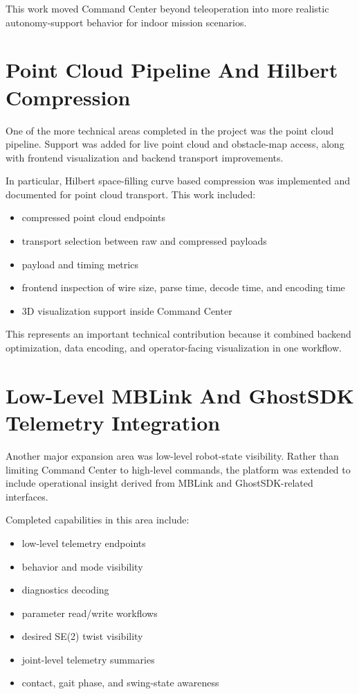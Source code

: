 \documentclass[11pt]{article}
\begin{document}
This work moved Command Center beyond teleoperation into more realistic autonomy-support behavior for indoor mission scenarios.

\section{Point Cloud Pipeline And Hilbert Compression}

One of the more technical areas completed in the project was the point cloud pipeline. Support was added for live point cloud and obstacle-map access, along with frontend visualization and backend transport improvements.

In particular, Hilbert space-filling curve based compression was implemented and documented for point cloud transport. This work included:

\begin{itemize}
  \item compressed point cloud endpoints
  \item transport selection between raw and compressed payloads
  \item payload and timing metrics
  \item frontend inspection of wire size, parse time, decode time, and encoding time
  \item 3D visualization support inside Command Center
\end{itemize}

This represents an important technical contribution because it combined backend optimization, data encoding, and operator-facing visualization in one workflow.

\section{Low-Level MBLink And GhostSDK Telemetry Integration}

Another major expansion area was low-level robot-state visibility. Rather than limiting Command Center to high-level commands, the platform was extended to include operational insight derived from MBLink and GhostSDK-related interfaces.

Completed capabilities in this area include:

\begin{itemize}
  \item low-level telemetry endpoints
  \item behavior and mode visibility
  \item diagnostics decoding
  \item parameter read/write workflows
  \item desired SE(2) twist visibility
  \item joint-level telemetry summaries
  \item contact, gait phase, and swing-state awareness
\end{itemize}
\end{document}
